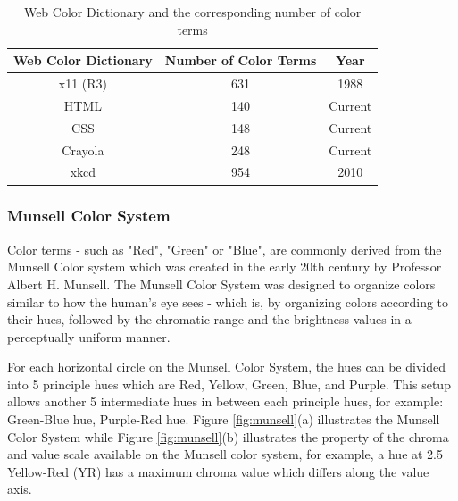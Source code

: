 \begin{table}[]
\centering
\begin{tabular}{|c|c|c|}
\hline
\multicolumn{1}{|c|}{\textbf{Web Color Dictionary}} & \multicolumn{1}{c|}{\textbf{Number of Color Terms}} & \multicolumn{1}{c|}{\textbf{Year}} \\ \hline
x11 (R3)                                            & 631                                                 & 1988                               \\ \hline
HTML                                                & 140                                                 & Current                            \\ \hline
CSS                                                 & 148                                                 & Current                            \\ \hline
Crayola                                             & 248                                                 & Current                            \\ \hline
xkcd                                                & 954                                                 & 2010                               \\ \hline
\end{tabular}
\caption{Web Color Dictionary and the corresponding number of color terms}
\label{table:allcolorterms}
\end{table}






\subsubsection{Munsell Color System}
\label{section:munsellcs}
Color terms - such as "Red", "Green" or "Blue", are commonly derived from the Munsell Color system which was created in the early 20th century by Professor Albert H. Munsell. The Munsell Color System was designed to organize colors similar to how the human's eye sees - which is, by organizing colors according to their hues, followed by the chromatic range and the brightness values in a perceptually uniform manner. 

For each horizontal circle on the Munsell Color System, the hues can be divided into 5 principle hues which are Red, Yellow, Green, Blue, and Purple. This setup allows another 5 intermediate hues in between each principle hues, for example: Green-Blue hue, Purple-Red hue. 
Figure \ref{fig:munsell}(a) illustrates the Munsell Color System while Figure \ref{fig:munsell}(b) illustrates the property of the chroma and value scale available on the Munsell color system, for example, a hue at 2.5 Yellow-Red (YR) has a maximum chroma value which differs along the value axis. 



